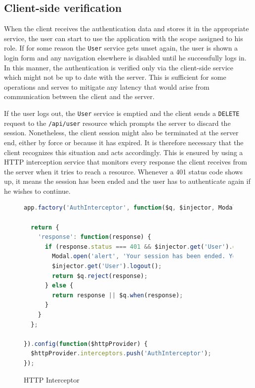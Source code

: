 \documentclass[thesis=M,english,hidelinks]{FITthesis}[2012/10/20]
\newcommand{\code}{\texttt}
\begin{document}
    \subsection{Client-side verification}

When the client receives the authentication data and stores it in the appropriate service, the user can start to use the application with the scope assigned to his role. If for some reason the \code{User} service gets unset again, the user is shown a login form and any navigation elsewhere is disabled until he successfully logs in. In this manner, the authentication is verified only via the client-side service which might not be up to date with the server. This is sufficient for some operations and serves to mitigate any latency that would arise from communication between the client and the server.

If the user logs out, the \code{User} service is emptied and the client sends a \code{DELETE} request to the \code{/api/user} resource which prompts the server to discard the session. Nonetheless, the client session might also be terminated at the server end, either by force or because it has expired. It is therefore necessary that the client recognizes this situation and acts accordingly. This is ensured by using a HTTP interception service that monitors every response the client receives from the server when it tries to reach a resource. Whenever a 401 status code shows up, it means the session has been ended and the user has to authenticate again if he wishes to continue.

\begin{figure}[h]
  \begin{lstlisting}[language=JavaScript]
app.factory('AuthInterceptor', function($q, $injector, Modal) {

  return {
    'response': function(response) {
      if (response.status === 401 && $injector.get('User').data) {
        Modal.open('alert', 'Your session has been ended. You will have to authenticate.', null, 'Log in');
        $injector.get('User').logout();
        return $q.reject(response);
      } else {
        return response || $q.when(response);
      }
    }
  };

}).config(function($httpProvider) {
  $httpProvider.interceptors.push('AuthInterceptor');
});
  \end{lstlisting}
  \caption{HTTP Interceptor}
  \label{fig:http_interceptor}
\end{figure}
\end{document}

